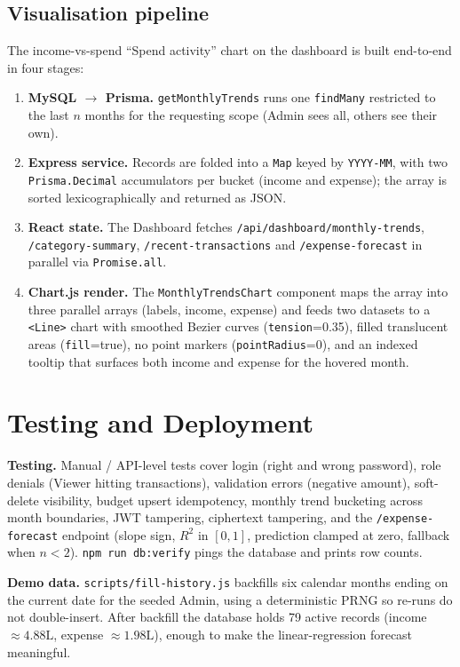 \documentclass[11pt,a4paper]{article}
\newcommand{\code}[1]{\texttt{\small #1}}
\begin{document}
\subsection{Visualisation pipeline}
The income-vs-spend ``Spend activity'' chart on the dashboard is built
end-to-end in four stages:
\begin{enumerate}
  \item \textbf{MySQL $\rightarrow$ Prisma.} \code{getMonthlyTrends}
        runs one \code{findMany} restricted to the last $n$ months for
        the requesting scope (Admin sees all, others see their own).
  \item \textbf{Express service.} Records are folded into a
        \code{Map} keyed by \code{YYYY-MM}, with two
        \code{Prisma.Decimal} accumulators per bucket
        (income and expense); the array is sorted lexicographically
        and returned as JSON.
  \item \textbf{React state.} The Dashboard fetches
        \code{/api/dashboard/monthly-trends},
        \code{/category-summary},
        \code{/recent-transactions} and
        \code{/expense-forecast} in parallel via
        \code{Promise.all}.
  \item \textbf{Chart.js render.} The \code{MonthlyTrendsChart}
        component maps the array into three parallel arrays
        (labels, income, expense) and feeds two datasets to a
        \code{<Line>} chart with smoothed Bezier curves
        (\code{tension}=0.35), filled translucent areas
        (\code{fill}=true), no point markers
        (\code{pointRadius}=0), and an indexed tooltip that surfaces
        both income and expense for the hovered month.
\end{enumerate}

\section{Testing and Deployment}
\textbf{Testing.} Manual / API-level tests cover login (right and
wrong password), role denials (Viewer hitting transactions), validation
errors (negative amount), soft-delete visibility, budget upsert
idempotency, monthly trend bucketing across month boundaries, JWT
tampering, ciphertext tampering, and the \code{/expense-forecast}
endpoint (slope sign, $R^2$ in $[0,1]$, prediction clamped at zero,
fallback when $n<2$). \code{npm run db:verify} pings the
database and prints row counts.

\textbf{Demo data.} \code{scripts/fill-history.js} backfills six
calendar months ending on the current date for the seeded Admin, using
a deterministic PRNG so re-runs do not double-insert. After backfill
the database holds 79 active records (income $\approx 4.88\text{L}$,
expense $\approx 1.98\text{L}$), enough to make the linear-regression
forecast meaningful.
\end{document}
